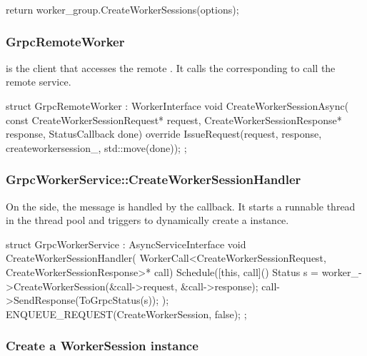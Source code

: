 \begin{content}
\begin{leftbar}
\begin{c++}
{  return worker_group.CreateWorkerSessions(options);
}
\end{c++}
\end{leftbar}

\subsubsection{GrpcRemoteWorker}

 is the  client that accesses the remote . It calls the corresponding  to call the remote service.

\begin{leftbar}
\begin{c++}
struct GrpcRemoteWorker : WorkerInterface {
  void CreateWorkerSessionAsync(
      const CreateWorkerSessionRequest* request,
      CreateWorkerSessionResponse* response,
      StatusCallback done) override {
    IssueRequest(request, response, createworkersession_, std::move(done));
  }
};
\end{c++}
\end{leftbar}

\subsubsection{GrpcWorkerService::CreateWorkerSessionHandler}

On the  side, the  message is handled by the  callback. It starts a runnable thread in the thread pool and triggers  to dynamically create a  instance.

\begin{leftbar}
\begin{c++}
struct GrpcWorkerService : AsyncServiceInterface {
  void CreateWorkerSessionHandler(
      WorkerCall<CreateWorkerSessionRequest, CreateWorkerSessionResponse>*
          call) {
    Schedule([this, call]() {
      Status s = worker_->CreateWorkerSession(&call->request, &call->response);
      call->SendResponse(ToGrpcStatus(s));
    });
    ENQUEUE_REQUEST(CreateWorkerSession, false);
  }
};
\end{c++}
\end{leftbar}

\subsubsection{Create a WorkerSession instance}


\end{content}
